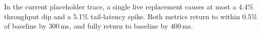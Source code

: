 In the current placeholder trace, a single live replacement causes at most a 4.4\% throughput dip and a 5.1\% tail-latency spike. Both metrics return to within 0.5\% of baseline by 300\,ms, and fully return to baseline by 400\,ms. 
